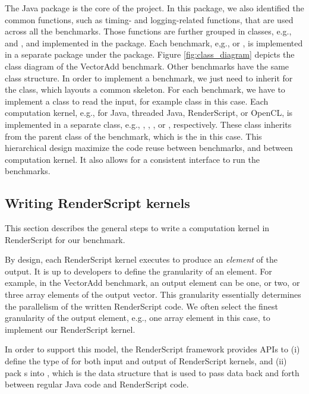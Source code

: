 The  Java package is the core of the project. In this package, we also
identified the common functions, such as timing- and logging-related functions,
that are used across all the benchmarks. Those functions are further grouped in
classes, e.g.,  and , and implemented in the 
package. Each benchmark, e,g.,  or , is implemented in a
separate package under the  package. Figure
\ref{fig:class_diagram} depicts the class diagram of the VectorAdd benchmark.
Other benchmarks have the same class structure. In order to implement a
benchmark, we just need to inherit for the  class, which
layouts a common skeleton. For each benchmark, we have to implement a class to
read the input, for example  class in this case. Each
computation kernel, e.g., for Java, threaded Java, RenderScript, or OpenCL, is
implemented in a separate class, e.g., ,
, , or ,
respectively. These class inherits from the parent class of the benchmark, which
is the  in this case. This hierarchical design maximize
the code reuse between benchmarks, and between computation kernel.
It also allows for a consistent interface to run the benchmarks.

\subsection*{Writing RenderScript kernels}
This section describes the general steps to write a computation kernel in
RenderScript for our benchmark.

By design, each RenderScript kernel executes to produce an \textit{element} of
the output. It is up to developers to define the granularity of an element. For
example, in the VectorAdd benchmark, an output element can be one, or two, or
three array elements of the output vector. This granularity essentially
determines the parallelism of the written RenderScript code. We often select the
finest granularity of the output element, e.g., one array element in this case,
to implement our RenderScript kernel.


In order to support this model, the RenderScript framework provides APIs to (i)
define the type of  for both input and output of RenderScript
kernels, and (ii) pack s into , which is the data
structure that is used to pass data back and forth between regular Java code and
RenderScript code.

